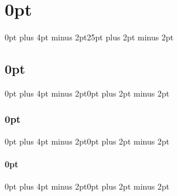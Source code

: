 \usepackage{arsclassica}

\usepackage[a4paper,hmarginratio=1:1]{geometry}
\usepackage[T1]{fontenc}
\usepackage{geometry}
\usepackage[utf8]{inputenc}
\usepackage[french]{babel}
\usepackage{amsmath,amssymb}
\usepackage{calc}
\usepackage{listings}
\usepackage{graphicx}
\usepackage{subfig}
\usepackage{lipsum}
\usepackage{shapepar}
\usepackage{amsmath} 
\usepackage{pifont}
\usepackage[eulerchapternumbers,subfig,beramono,eulermath,pdfspacing,listings]{classicthesis}
\usepackage[onehalfspacing]{setspace}
\usepackage{pdfpages}
\usepackage{fancyvrb}
\usepackage{enumitem}
\usepackage{float}
\usepackage{tcolorbox}

\frenchspacing
\renewcommand*{\FrenchLabelItem}{\color{halfgray}$\bullet$}

\newcommand{\ie}{\textit{i.e.~}}
\newcommand{\eg}{\textit{e.g.~}}

\baselineskip=12pt
\setlength{\parskip}{\baselineskip}

\titlespacing\chapter{0pt}{0pt plus 4pt minus 2pt}{25pt plus 2pt minus 2pt}
\titlespacing\section{0pt}{0pt plus 4pt minus 2pt}{0pt plus 2pt minus 2pt}
\titlespacing\subsection{0pt}{0pt plus 4pt minus 2pt}{0pt plus 2pt minus 2pt}
\titlespacing\subsubsection{0pt}{0pt plus 4pt minus 2pt}{0pt plus 2pt minus 2pt}


